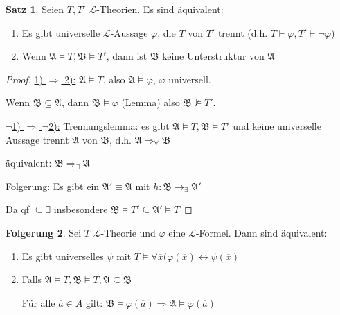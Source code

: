 \documentclass[12pt,parskip=full]{scrartcl}
\newcommand{\heading}{\underline}
\theoremstyle{definition}
\newtheorem{theorem}{Satz}[section]
\newtheorem{corollary}[theorem]{Folgerung}
\begin{document}
	\begin{theorem}
		Seien $T, T'$ $\mathcal{L}$-Theorien. Es sind äquivalent:
		\begin{enumerate}
			\item Es gibt universelle $\mathcal{L}$-Aussage $\varphi$, die $T$ von $T'$ trennt (d.h. $T \vdash \varphi, T' \vdash \lnot \varphi$)
			\item Wenn $\mathfrak{A} \models T, \mathfrak{B} \models T'$, dann ist $\mathfrak{B}$ keine Unterstruktur von $\mathfrak{A}$
		\end{enumerate}
	\end{theorem}

	\begin{proof}
		\heading{1) $\Rightarrow$ 2):} $\mathfrak{A} \models T$, also $\mathfrak{A} \models \varphi$, $\varphi$ universell.
		
		Wenn $\mathfrak{B} \subseteq \mathfrak{A}$, dann $\mathfrak{B} \models \varphi$ (Lemma) also $\mathfrak{B} \not\models T'$.
		
		\heading{$\lnot$1) $\Rightarrow$ $\lnot$2):} Trennungslemma: es gibt $\mathfrak{A} \models T, \mathfrak{B} \models T'$ und keine universelle Aussage trennt $\mathfrak{A}$ von $\mathfrak{B}$, d.h. $\mathfrak{A} \Rightarrow_\forall \mathfrak{B}$
		
		äquivalent: $\mathfrak{B} \Rightarrow_\exists \mathfrak{A}$
		
		Folgerung: Es gibt ein $\mathfrak{A}' \equiv \mathfrak{A}$ mit $h: \mathfrak{B} \to_\exists \mathfrak{A}'$
		
		Da qf $\subseteq \exists$ insbesondere $\mathfrak{B} \models T' \subseteq \mathfrak{A}' \models T$
	\end{proof}

	\begin{corollary}
		Sei $T$ $\mathcal{L}$-Theorie und $\varphi$ eine $\mathcal{L}$-Formel. Dann sind äquivalent:
		\begin{enumerate}
			\item Es gibt universelles $\psi$ mit $T \models \forall \overline{x} (\varphi(\overline{x}) \leftrightarrow \psi(\overline{x})$
			\item Falls $\mathfrak{A} \models T, \mathfrak{B} \models T, \mathfrak{A} \subseteq \mathfrak{B}$
			
			Für alle $\overline{a} \in A$ gilt: $\mathfrak{B} \models \varphi(\overline{a}) \Rightarrow \mathfrak{A} \models \varphi(\overline{a})$
		\end{enumerate}
	\end{corollary}
\end{document}
